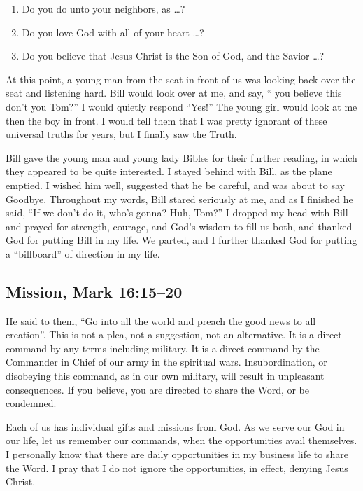 \documentclass[12pt]{memoir}
\begin{document}
\begin{enumerate}
\item Do you do unto your neighbors, as \dots ? 
\item Do you love God with all of your heart \dots ? 
\item Do you believe that Jesus Christ is the Son of God, and the Savior \dots ? 
\end{enumerate}

At this point, a young man from the seat in front of us was looking
back over the seat and listening hard. Bill would look over at me,
and say, `` you believe this don't you Tom?'' I would quietly respond
``Yes!'' The young girl would look at me then the boy in front.
I would tell them that I was pretty ignorant of these universal truths
for years, but I finally saw the Truth.

Bill gave the young man and young lady Bibles for their further reading,
in which they appeared to be quite interested. I stayed behind with
Bill, as the plane emptied. I wished him well, suggested that he be
careful, and was about to say Goodbye. Throughout my words, Bill stared
seriously at me, and as I finished he said, ``If we don't do it,
who's gonna? Huh, Tom?'' I dropped my head with Bill and prayed for
strength, courage, and God's wisdom to fill us both, and thanked God
for putting Bill in my life. We parted, and I further thanked God
for putting a ``billboard'' of direction in my life.

\subsection[Mission Mark]{Mission, Mark 16:15--20}


He said to them, ``Go into all the world and preach the good news to all creation''. This is not a plea, not a suggestion, not an alternative. It is a direct command by any terms including military. It is a direct command by the Commander in Chief of our army in the spiritual wars. Insubordination, or disobeying this command, as in our own military, will result in unpleasant consequences. If you believe, you are directed to share the Word, or be condemned.

Each of us has individual gifts and missions from God. As we serve our God in our life, let us remember our commands, when the opportunities avail themselves. I personally know that there are daily opportunities in my business life to share the Word. I pray that I do not ignore the opportunities, in effect, denying Jesus Christ.
\end{document}
